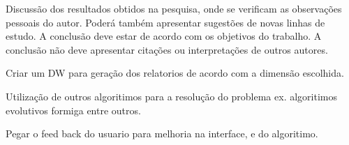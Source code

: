 

\iniciocapitulo
Discussão dos resultados obtidos na pesquisa, onde se verificam as observações pessoais do autor. Poderá também apresentar sugestões de novas linhas de estudo. A conclusão deve estar de acordo com os objetivos do trabalho. A conclusão não deve apresentar citações ou interpretações de outros autores.


Criar um DW para geração dos relatorios de acordo com a dimensão escolhida.

Utilização de outros algoritimos para a resolução do problema ex. algoritimos evolutivos formiga entre outros.

Pegar o feed back do usuario para melhoria na interface, e do algoritimo.